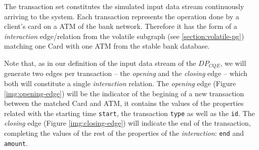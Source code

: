 \documentclass{article}
\begin{document}

The transaction set constitutes the simulated input data stream continuously arriving to the system. Each transaction represents the operation done by a client's card on a ATM of the bank network. Therefore it has the form of a \emph{interaction} edge/relation from the volatile subgraph (see \ref{section:volatile-pg}) matching one Card with one ATM from the stable bank database.

Note that, as in our definition of the input data stream of the $DP_{CQE}$, we will generate two edges per transaction -- the \emph{opening} and the \emph{closing} edge -- which both will constitute a single \emph{interaction} relation. The \emph{opening} edge (Figure \ref{img:opening-edge}) will be the indicator of the begining of a new transaction between the matched Card and ATM, it contains the values of the properties related with the starting time \texttt{start}, the transaction \texttt{type} as well as the \texttt{id}. The \emph{closing} edge (Figure \ref{img:closing-edge}) will indicate the end of the transaction, completing the values of the rest of the properties of the \emph{interaction}: \texttt{end} and \texttt{amount}.
\end{document}
